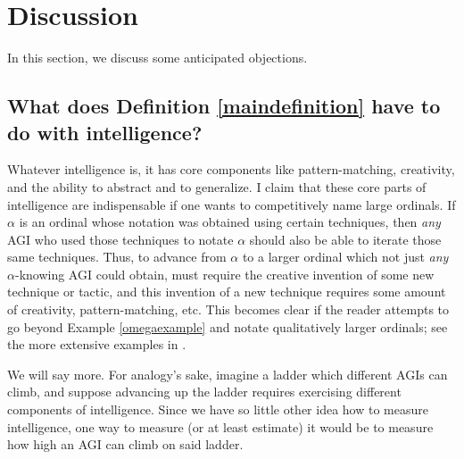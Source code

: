\documentclass[runningheads]{llncs}
\begin{document}
\section{Discussion}
\label{objectionsection}

In this section, we discuss some anticipated objections.

\subsection{What does Definition \ref{maindefinition} have to do with intelligence?}
\label{justificationsubsection}

Whatever intelligence is, it has core components like pattern-matching,
creativity, and the ability to abstract and to generalize.
I claim that these core parts of intelligence are indispensable if one wants to
competitively name large ordinals. If $\alpha$ is an ordinal whose
notation was obtained using certain techniques, then \emph{any} AGI who used those
techniques to notate $\alpha$ should also be able to iterate those same techniques.
Thus, to advance from
$\alpha$ to a larger ordinal which not just \emph{any} $\alpha$-knowing
AGI could obtain, must require the creative invention of some new technique or tactic, and
this invention of a new technique requires some amount of creativity,
pattern-matching, etc. This becomes clear if the reader attempts to
go beyond Example \ref{omegaexample} and notate qualitatively larger ordinals;
see the more extensive examples in \cite{alexander2019measuring}.

We will say more.
For analogy's sake, imagine a ladder which different AGIs
can climb, and suppose advancing up the ladder requires exercising different
components of intelligence. Since we have so little other idea how to measure
intelligence, one way to measure (or at least estimate) it would be
to measure how high an AGI can climb on said ladder.
\end{document}
